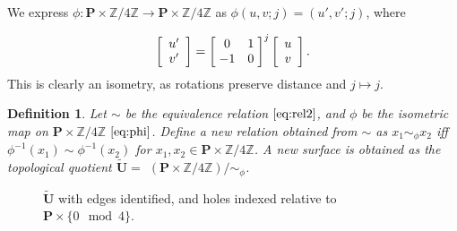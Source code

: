 \documentclass[]{article}
\newtheorem{Def}{Definition}[subsection]
\begin{document}
We express $\phi:\mathbf{P}\times\mathbb{Z}/4\mathbb{Z} \rightarrow \mathbf{P}\times\mathbb{Z}/4\mathbb{Z}$ as $\phi(u,v;j) = (u',v';j)$, where

\begin{equation}
	\left[\begin{array}{c}
		u'\\v'
	\end{array}\right] =
		\left[ \hspace{1mm} \begin{matrix}
				0 & 1\\
				-1 & 0
			\end{matrix}\hspace{1mm}\right]^{j}\left[\begin{array}{c}
					u\\v
				\end{array}\right].
\label{eq:phi}
\end{equation}
This is clearly an isometry, as rotations preserve distance and $j\mapsto j$.

\begin{Def} Let $\sim$ be the equivalence relation $\eqref{eq:rel2}$, and $\phi$ be the isometric map on $\mathbf{P}\times\mathbb{Z}/4\mathbb{Z}$ $\eqref{eq:phi}$. Define a new relation obtained from $\sim$ as $x_1\sim_{\phi}x_2$ iff $\phi^{-1}(x_1) \sim \phi^{-1}(x_2)$ for $x_1,x_2\in\mathbf{P}\times\mathbb{Z}/4\mathbb{Z}$. A new surface is obtained as the topological quotient $\tilde{\mathbf{U}}=$ $(\mathbf{P}\times\mathbb{Z}/4\mathbb{Z})/\sim_{\phi}$.\label{eq:simphi}
\end{Def}


\begin{figure}[H]
\centering

\caption{$\tilde{\mathbf{U}}$ with edges identified, and holes indexed relative to $\mathbf{P}\times\{0\mod{4}\}$.}
\label{fig:utilda}
\end{figure}
\end{document}

